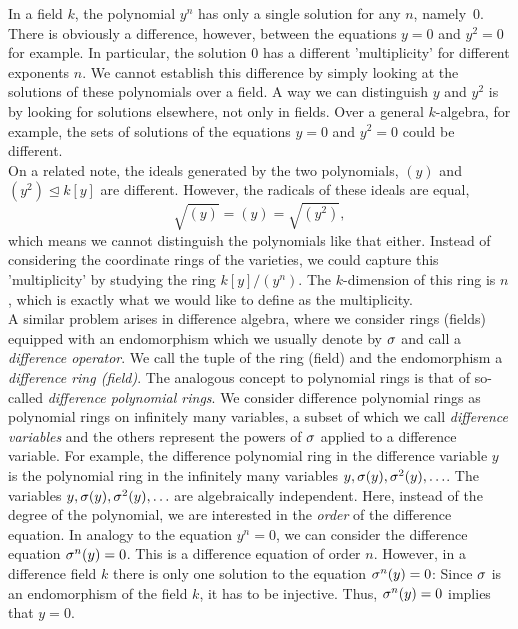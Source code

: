 In a field $k$, the polynomial $y^n$ has only a single solution for any $n$, namely~$0$. 
There is obviously a difference, however, between the equations $y = 0$ and $y^2 = 0$ for example. In particular, the solution $0$ has a different 'multiplicity' for different exponents $n$.
We cannot establish this difference by simply looking at the solutions of these polynomials over a field.
  A way we can distinguish $y$ and $y^2$ is by looking for solutions elsewhere, not only in fields.
Over a general $k$-algebra, for example, the sets of solutions of the equations $y = 0$ and $y^2 = 0$ could be different. \\


On a related note, the ideals generated by the two polynomials, $(y)$ and $(y^2) \unlhd k[y]$ are different. However, the radicals of these ideals are equal,
$$ \sqrt{ (y) } = (y) = \sqrt{(y^2)}, $$ which means we cannot distinguish the polynomials like that either.
Instead of considering the coordinate rings of the varieties, we could capture this 'multiplicity' by studying the ring $k[y]/(y^n)$.
The $k$-dimension of this ring is $n$, which is exactly what we would like to define as the multiplicity. \\

A similar problem arises in difference algebra, where we consider rings (fields) equipped with an endomorphism which we usually denote by $\sigma$ and call a \emph{difference operator}. We call the tuple of the ring (field) and the endomorphism a \emph{difference ring (field)}.
The analogous concept to polynomial rings is that of so-called \emph{difference polynomial rings}. We consider difference polynomial rings as polynomial rings on infinitely many variables, a subset of which we call \emph{difference variables} and the others represent the powers of $\sigma$ applied to a difference variable. 
For example, the difference polynomial ring in the difference variable $y$ is the polynomial ring in the infinitely many variables $y, \sigma(y), \sigma^2(y),\ldots$.
The variables $y, \sigma(y), \sigma^2(y), \ldots$ are algebraically independent.
Here, instead of the degree of the polynomial, we are interested in the \emph{order} of the difference equation.
In analogy to the equation $y^n = 0$, we can consider the difference equation $\sigma^n(y) = 0$. This is a difference equation of order $n$.
However, in a difference field $k$ there is only one solution to the equation $\sigma^n(y) = 0$: Since $\sigma$ is an endomorphism of the field $k$,
it has to be injective. Thus, $\sigma^n(y) = 0$ implies that $y = 0$. \\

